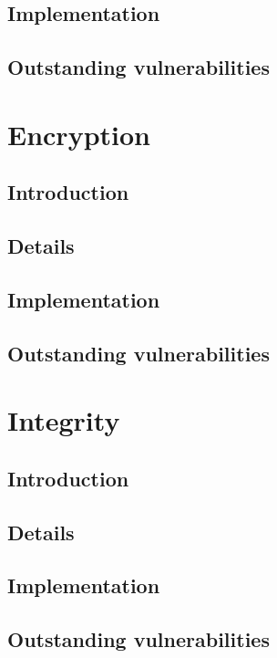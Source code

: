 \documentclass[a4paper,11pt]{article}
\begin{document}
\subsection{Implementation}

\subsection{Outstanding vulnerabilities}
 
\section{Encryption}

\subsection{Introduction}

\subsection{Details}

\subsection{Implementation}

\subsection{Outstanding vulnerabilities}

\section{Integrity}

\subsection{Introduction}

\subsection{Details}

\subsection{Implementation}

\subsection{Outstanding vulnerabilities}
\end{document}
